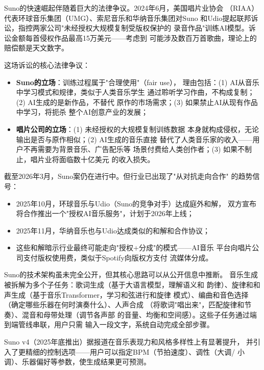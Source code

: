 \begin{whybox}
Suno的快速崛起伴随着巨大的法律争议。2024年6月，美国唱片业协会
（RIAA）代表环球音乐集团（UMG）、索尼音乐和华纳音乐集团对Suno
和Udio提起联邦诉讼，指控两家公司"未经授权大规模复制受版权保护的
录音作品"训练AI模型。诉讼金额每首侵权作品最高15万美元——考虑到
可能涉及数百万首歌曲，理论上的赔偿额是天文数字。

这场诉讼的核心法律争议：
\begin{itemize}
  \item \textbf{Suno的立场}：训练过程属于"合理使用"（fair use），
    理由包括：(1) AI从音乐中学习模式和规律，类似于人类音乐学生
    通过聆听学习作曲，不构成复制；(2) AI生成的是新作品，不替代
    原作的市场需求；(3) 如果禁止AI从现有作品中学习，将扼杀
    整个AI创意产业的发展；
  \item \textbf{唱片公司的立场}：(1) 未经授权的大规模复制训练数据
    本身就构成侵权，无论输出是否与原作相似；(2) AI生成的音乐直接
    替代了人类音乐家的收入——用户不再需要为背景音乐、广告配乐等
    场景付费给人类创作者；(3) 如果不制止，唱片业将面临数十亿美元
    的收入损失。
\end{itemize}

截至2026年3月，Suno案仍在进行中。但行业已出现了"从对抗走向合作"
的趋势信号：
\begin{itemize}
  \item 2025年10月，环球音乐与Udio（Suno的竞争对手）达成庭外和解，
    双方宣布将合作推出一个"授权AI音乐服务"，计划于2026年上线；
  \item 2025年11月，华纳音乐也与Udio达成类似的和解和合作协议；
  \item 这些和解暗示行业最终可能走向"授权+分成"的模式——AI音乐
    平台向唱片公司支付版权使用费，类似于Spotify向版权方支付
    流媒体分成。
\end{itemize}
\end{whybox}

Suno的技术架构虽未完全公开，但其核心思路可以从公开信息中推断。
音乐生成被拆解为多个子任务：歌词生成（基于大语言模型，理解语义和
韵律）、旋律和和声生成（基于音乐Transformer，学习和弦进行和旋律
模式）、编曲和音色选择（确定哪些乐器在何时演奏什么）、人声合成
（将歌词"唱出来"，匹配旋律和节奏）、混音和母带处理（调节各声部
的音量、均衡和空间感）。这些子任务通过端到端管线串联，用户只需
输入一段文字，系统自动完成全部步骤。

Suno v4（2025年底推出）据报道在音乐表现力和风格多样性上有显著提升，
并引入了更精细的控制选项——用户可以指定BPM（节拍速度）、调性（大调/
小调）、乐器偏好等参数，使生成结果更可预测。

